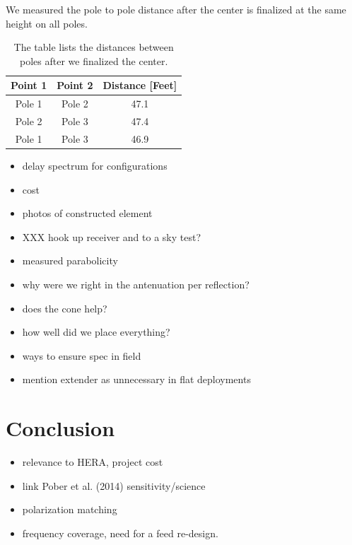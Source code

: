 \documentclass[preprint]{aastex}  %
\begin{document}
We measured the pole to pole distance after the center is finalized at the same height on all poles.

\begin{table}[!h]
\centering
\begin{tabular}{|c|c|c|} \hline

Point 1 & Point 2 & Distance [Feet] \\ \hline
Pole 1 & Pole 2 & 47.1 \\ \hline
Pole 2 & Pole 3 & 47.4 \\ \hline
Pole 1 & Pole 3 & 46.9 \\ \hline


\end{tabular}
\caption{The table lists the distances between poles after we finalized the center. \label{Tab:dist_p2p}}
\end{table}





 

\begin{itemize}
\item delay spectrum for configurations
\item cost
\item photos of constructed element
\item XXX hook up receiver and to a sky test?
\item measured parabolicity
\item why were we right in the antenuation per reflection?
\item does the cone help?
\item how well did we place everything?
\item ways to ensure spec in field
\item mention extender as unnecessary in flat deployments
\end{itemize}

\section{Conclusion}
\label{sec:conclusion}

\begin{itemize}
\item relevance to HERA, project cost
\item link Pober et al. (2014) sensitivity/science
\item polarization matching
\item frequency coverage, need for a feed re-design.
\end{itemize}
\end{document}
